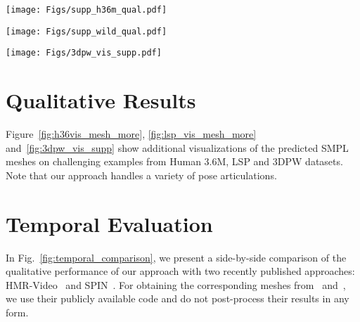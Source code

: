 \documentclass[10pt,twocolumn,letterpaper]{article}
\begin{document}
 
\begin{figure*}[t!]
	\centering
	\texttt{[image: Figs/supp\_h36m\_qual.pdf]} 
	\caption{Visualization of SMPL mesh obtained using predicted parameters on challenging examples from Human3.6M. Each example shows input image with input 2D landmarks, recovered SMPL mesh with reprojected 2d pose predictions, and the same mesh from a different view. }
	\label{fig:h36vis_mesh_more}
\end{figure*}

\begin{figure*}[t!]
	\centering
	\texttt{[image: Figs/supp\_wild\_qual.pdf]} 
	\caption{Visualization of SMPL mesh obtained using predicted parameters on challenging examples from LSP. Each example shows input image, recovered SMPL mesh, and the same mesh from a different view.}
	\label{fig:lsp_vis_mesh_more}
\end{figure*}

\begin{figure*}[t!]
	\centering
	\texttt{[image: Figs/3dpw\_vis\_supp.pdf]} 
	\caption{Visualization of SMPL mesh obtained using predicted parameters on challenging examples from 3DPW. Each example shows input image, recovered SMPL mesh, and the same mesh from a different view.}
	\label{fig:3dpw_vis_supp}
\end{figure*}

\section{Qualitative Results}
Figure~\ref{fig:h36vis_mesh_more}, \ref{fig:lsp_vis_mesh_more} and~\ref{fig:3dpw_vis_supp} show additional visualizations of the predicted SMPL meshes on challenging examples from Human 3.6M, LSP and 3DPW datasets. Note that our approach handles a variety of pose articulations. 

\section{Temporal Evaluation}
In Fig.~\ref{fig:temporal_comparison}, we present a side-by-side comparison of the qualitative performance of our approach with two recently published approaches: HMR-Video~\cite{kanazawa2019learning} and SPIN~\cite{SPIN_ICCV2019}. For obtaining the corresponding meshes from~\cite{kanazawa2019learning} and~\cite{SPIN_ICCV2019}, we use their publicly available code and do not post-process their results in any form. 
\end{document}
